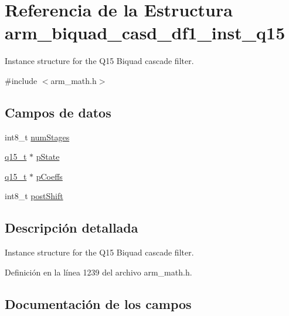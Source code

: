 \hypertarget{structarm__biquad__casd__df1__inst__q15}{}\section{Referencia de la Estructura arm\+\_\+biquad\+\_\+casd\+\_\+df1\+\_\+inst\+\_\+q15}
\label{structarm__biquad__casd__df1__inst__q15}


Instance structure for the Q15 Biquad cascade filter.  




{\ttfamily \#include $<$arm\+\_\+math.\+h$>$}

\subsection*{Campos de datos}
\begin{DoxyCompactItemize}
\item 
int8\+\_\+t \hyperlink{structarm__biquad__casd__df1__inst__q15_af59c4ceb94f92d6613492b37e7c949de}{num\+Stages}
\item 
\hyperlink{arm__math_8h_ab5a8fb21a5b3b983d5f54f31614052ea}{q15\+\_\+t} $\ast$ \hyperlink{structarm__biquad__casd__df1__inst__q15_ae29dfdb736374fcddaeaec4b7770170c}{p\+State}
\item 
\hyperlink{arm__math_8h_ab5a8fb21a5b3b983d5f54f31614052ea}{q15\+\_\+t} $\ast$ \hyperlink{structarm__biquad__casd__df1__inst__q15_a7ca181a37f714d174445f486bebce26f}{p\+Coeffs}
\item 
int8\+\_\+t \hyperlink{structarm__biquad__casd__df1__inst__q15_a3603cbf084938b6931bcb05dfe487f09}{post\+Shift}
\end{DoxyCompactItemize}


\subsection{Descripción detallada}
Instance structure for the Q15 Biquad cascade filter. 

Definición en la línea 1239 del archivo arm\+\_\+math.\+h.



\subsection{Documentación de los campos}
